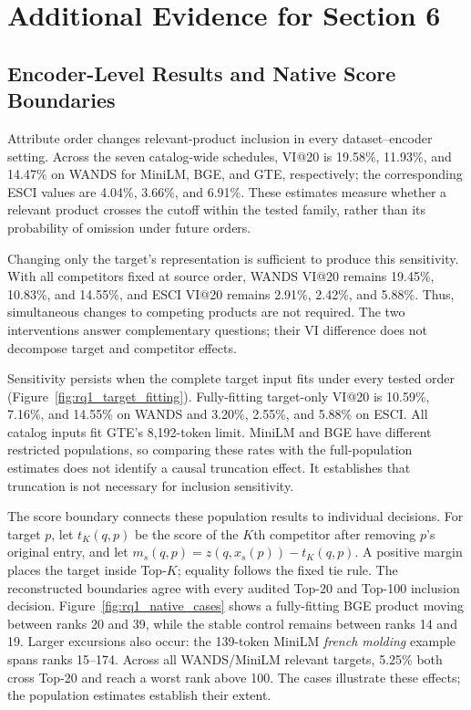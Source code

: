 \section{Additional Evidence for Section 6}
\label{app:ch6_evidence}

\subsection{Encoder-Level Results and Native Score Boundaries}
\label{app:ch6_boundaries}

Attribute order changes relevant-product inclusion in every dataset--encoder setting. Across the seven catalog-wide schedules, VI@20 is 19.58\%, 11.93\%, and 14.47\% on WANDS for MiniLM, BGE, and GTE, respectively; the corresponding ESCI values are 4.04\%, 3.66\%, and 6.91\%. These estimates measure whether a relevant product crosses the cutoff within the tested family, rather than its probability of omission under future orders.

Changing only the target's representation is sufficient to produce this sensitivity. With all competitors fixed at source order, WANDS VI@20 remains 19.45\%, 10.83\%, and 14.55\%, and ESCI VI@20 remains 2.91\%, 2.42\%, and 5.88\%. Thus, simultaneous changes to competing products are not required. The two interventions answer complementary questions; their VI difference does not decompose target and competitor effects.

Sensitivity persists when the complete target input fits under every tested order (Figure~\ref{fig:rq1_target_fitting}). Fully-fitting target-only VI@20 is 10.59\%, 7.16\%, and 14.55\% on WANDS and 3.20\%, 2.55\%, and 5.88\% on ESCI. All catalog inputs fit GTE's 8,192-token limit. MiniLM and BGE have different restricted populations, so comparing these rates with the full-population estimates does not identify a causal truncation effect. It establishes that truncation is not necessary for inclusion sensitivity.

The score boundary connects these population results to individual decisions. For target $p$, let $t_K(q,p)$ be the score of the $K$th competitor after removing $p$'s original entry, and let $m_s(q,p)=z(q,x_s(p))-t_K(q,p)$. A positive margin places the target inside Top-$K$; equality follows the fixed tie rule. The reconstructed boundaries agree with every audited Top-20 and Top-100 inclusion decision. Figure~\ref{fig:rq1_native_cases} shows a fully-fitting BGE product moving between ranks 20 and 39, while the stable control remains between ranks 14 and 19. Larger excursions also occur: the 139-token MiniLM \emph{french molding} example spans ranks 15--174. Across all WANDS/MiniLM relevant targets, 5.25\% both cross Top-20 and reach a worst rank above 100. The cases illustrate these effects; the population estimates establish their extent.

